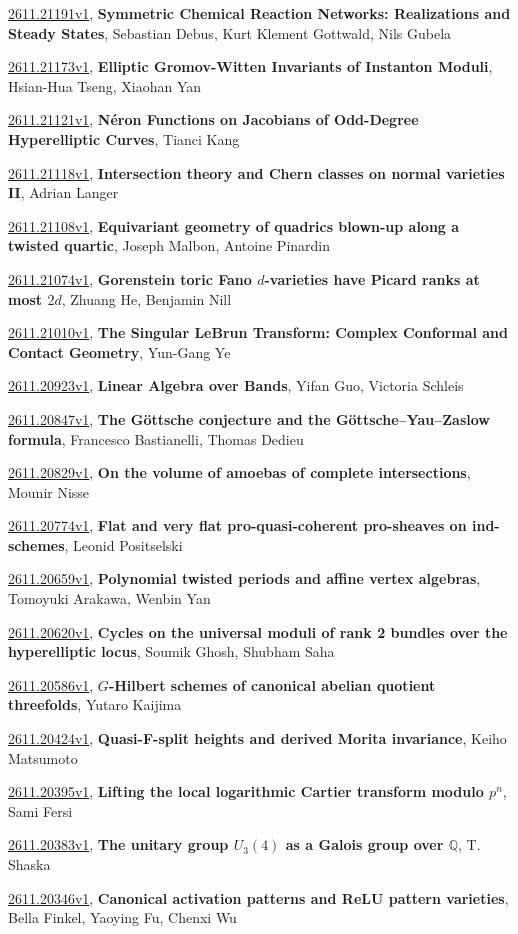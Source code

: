 \documentclass[9pt, a4paper]{article}
\theoremstyle{plain}
\theoremstyle{definition}
\theoremstyle{remark}
\newcommand{\arxiv}[3]{\href{https://arxiv.org/abs/#1}{#1}, \textbf{\textcolor{arxivblue}{#2}}, #3}
\begin{document}
\arxiv{2611.21191v1}{Symmetric Chemical Reaction Networks: Realizations and Steady States}{Sebastian Debus, Kurt Klement Gottwald, Nils Gubela}

\arxiv{2611.21173v1}{Elliptic Gromov-Witten Invariants of Instanton Moduli}{Hsian-Hua Tseng, Xiaohan Yan}

\arxiv{2611.21121v1}{Néron Functions on Jacobians of Odd-Degree Hyperelliptic Curves}{Tianci Kang}

\arxiv{2611.21118v1}{Intersection theory and Chern classes on normal varieties II}{Adrian Langer}

\arxiv{2611.21108v1}{Equivariant geometry of quadrics blown-up along a twisted quartic}{Joseph Malbon, Antoine Pinardin}

\arxiv{2611.21074v1}{Gorenstein toric Fano $d$-varieties have Picard ranks at most $2d$}{Zhuang He, Benjamin Nill}

\arxiv{2611.21010v1}{The Singular LeBrun Transform: Complex Conformal and Contact Geometry}{Yun-Gang Ye}

\arxiv{2611.20923v1}{Linear Algebra over Bands}{Yifan Guo, Victoria Schleis}

\arxiv{2611.20847v1}{The Göttsche conjecture and the Göttsche--Yau--Zaslow formula}{Francesco Bastianelli, Thomas Dedieu}

\arxiv{2611.20829v1}{On the volume of amoebas of complete intersections}{Mounir Nisse}

\arxiv{2611.20774v1}{Flat and very flat pro-quasi-coherent pro-sheaves on ind-schemes}{Leonid Positselski}

\arxiv{2611.20659v1}{Polynomial twisted periods and affine vertex algebras}{Tomoyuki Arakawa, Wenbin Yan}

\arxiv{2611.20620v1}{Cycles on the universal moduli of rank 2 bundles over the hyperelliptic locus}{Soumik Ghosh, Shubham Saha}

\arxiv{2611.20586v1}{$G$-Hilbert schemes of canonical abelian quotient threefolds}{Yutaro Kaijima}

\arxiv{2611.20424v1}{Quasi-F-split heights and derived Morita invariance}{Keiho Matsumoto}

\arxiv{2611.20395v1}{Lifting the local logarithmic Cartier transform modulo $p^n$}{Sami Fersi}

\arxiv{2611.20383v1}{The unitary group $U_3(4)$ as a Galois group over $\mathbb{Q}$}{T. Shaska}

\arxiv{2611.20346v1}{Canonical activation patterns and ReLU pattern varieties}{Bella Finkel, Yaoying Fu, Chenxi Wu}
\end{document}
